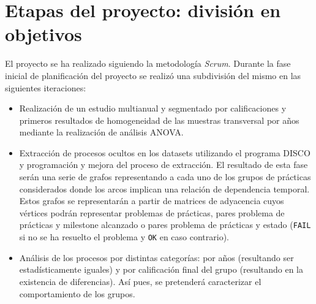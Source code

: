 \chapter{Etapas del proyecto: división en objetivos}\label{chapter:objetivos}

El proyecto se ha realizado siguiendo la metodología \emph{Scrum}. Durante la fase inicial de planificación del proyecto se realizó una subdivisión del mismo en las siguientes iteraciones:
\begin{itemize}
\item Realización de un estudio multianual y segmentado por calificaciones y primeros resultados de homogeneidad de las muestras transversal por años mediante la realización de análisis ANOVA.
\item Extracción de procesos ocultos en los datasets utilizando el programa DISCO y programación y mejora del proceso de extracción. El resultado de esta fase serán una serie de grafos representando a cada uno de los grupos de prácticas considerados donde los arcos implican una relación de dependencia temporal. Estos grafos se representarán a partir de matrices de adyacencia cuyos vértices podrán representar problemas de prácticas, pares problema de prácticas y milestone alcanzado o pares problema de prácticas y estado (\texttt{FAIL} si no se ha resuelto el problema y \texttt{OK} en caso contrario).
\item Análisis de los procesos por distintas categorías: por años (resultando ser estadísticamente iguales) y por calificación final del grupo (resultando en la existencia de diferencias). Así pues, se pretenderá caracterizar el comportamiento de los grupos.
\end{itemize}